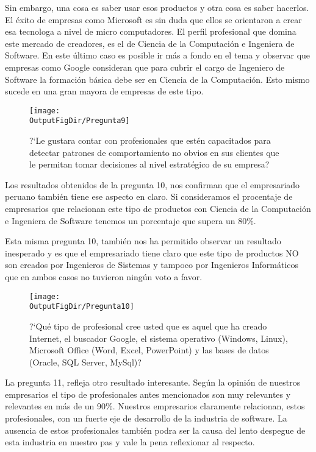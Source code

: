Sin embargo, una cosa es saber usar esos productos y otra cosa es saber hacerlos. El éxito de empresas como Microsoft es sin duda que ellos se orientaron a crear esa tecnolog­a a nivel de micro computadores. El perfil profesional que domina este mercado de creadores, es el de Ciencia de la Computación e Ingenier­a de Software. En este último caso es posible ir más a fondo en el tema y observar que empresas como Google consideran que para cubrir el cargo de Ingeniero de Software la formación básica debe ser en Ciencia de la Computación. Esto mismo sucede en una gran mayor­a de empresas de este tipo.

\begin{figure}[!h]
	\centering
	\texttt{[image: \\OutputFigDir/Pregunta9]}
	\label{fig:Preg9}
	\caption{?`Le gustar­a contar con profesionales que estén capacitados para detectar patrones de comportamiento no obvios en sus clientes que le permitan tomar decisiones al nivel estratégico de su empresa?}
\end{figure}

Los resultados obtenidos de la pregunta 10, nos confirman que el empresariado peruano también tiene ese aspecto en claro. Si consideramos el procentaje de empresarios que relacionan este tipo de productos con Ciencia de la Computación e Ingenier­a de Software tenemos un porcentaje que supera un 80\%.

Esta misma pregunta 10, también nos ha permitido observar un resultado inesperado y es que el empresariado tiene claro que este tipo de productos NO son creados por Ingenieros de Sistemas y tampoco por Ingenieros Informáticos que en ambos casos no tuvieron ningún voto a favor.

\begin{figure}[!h]
	\centering
	\texttt{[image: \\OutputFigDir/Pregunta10]}
	\label{fig:Preg10}
	\caption{?`Qué tipo de profesional cree usted que es aquel que ha creado Internet, el buscador Google, el sistema operativo (Windows, Linux), Microsoft Office (Word, Excel, PowerPoint) y las bases de datos (Oracle, SQL Server, MySql)?}
\end{figure}

La pregunta 11, refleja otro resultado interesante. Según la opinión de nuestros empresarios el tipo de profesionales antes mencionados son muy relevantes y relevantes en más de un 90\%. Nuestros empresarios claramente relacionan, estos profesionales, con un fuerte eje de desarrollo de la industria de software. La ausencia de estos profesionales también podr­a ser la causa del lento despegue de esta industria en nuestro pa­s y vale la pena reflexionar al respecto.

